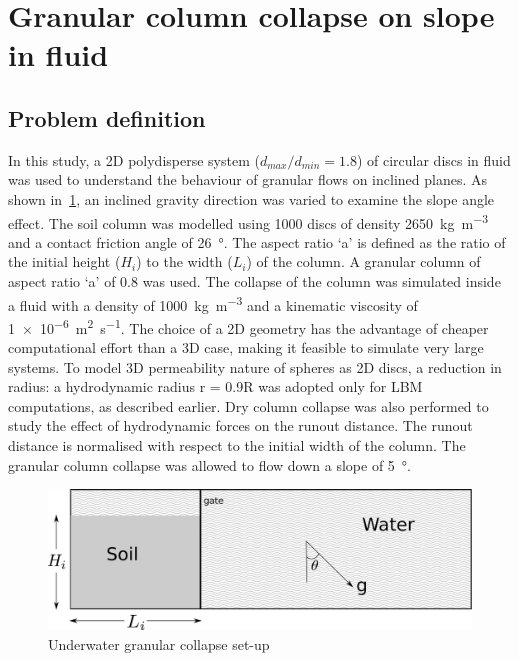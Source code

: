 \documentclass[12pt,twoside]{tuhhproc-en}
\begin{document}
\section{Granular column collapse on slope in fluid}
\subsection{Problem definition}
In this study, a 2D polydisperse system ($d_{max}/d_{min} = 1.8$) of circular discs in fluid was used to understand the behaviour of granular flows on inclined planes. As shown in~\cref{fig:setup}, an inclined gravity direction was varied to examine the slope angle effect. The soil column was modelled using 1000 discs of density \SI{2650}{\kg\per\cubic\meter} and a contact friction angle of \SI{26}{\degree}. The aspect ratio `a' is defined as the ratio of the initial height ($H_i$) to the width ($L_i$) of the column. A granular column of aspect ratio `a' of 0.8 was used. The collapse of the column was simulated inside a fluid with a density of \SI{1000}{\kg\per\cubic\meter} and a kinematic viscosity of \SI{1e-6}{\square\meter\per\second}. The choice of a 2D geometry has the advantage of cheaper computational effort than a 3D case, making it feasible to simulate very large systems. To model 3D permeability nature of spheres as 2D discs, a reduction in radius: a  hydrodynamic radius r = 0.9R was adopted only for LBM computations, as described earlier. Dry column collapse was also performed to study the effect of hydrodynamic forces on the runout distance. The runout distance is normalised with respect to the initial width of the column. The granular column collapse was allowed to flow down a slope of \SI{5}{\degree}. 


\begin{figure}[htpb]
  \centering
\includegraphics[width=0.97\columnwidth]{figs/geometry}
\caption{Underwater granular collapse set-up}
\label{fig:setup}
\end{figure}
\end{document}
